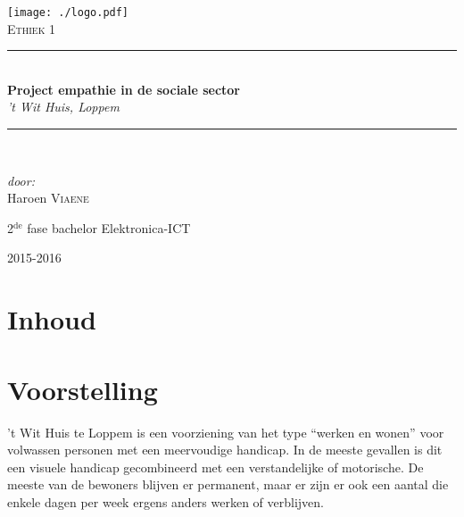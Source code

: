 \documentclass[a4paper,12pt]{article}
\newcommand{\HRule}{\rule{\linewidth}{0.5mm}}
\begin{document}
\begin{titlepage}
\begin{center}
\texttt{[image: ./logo.pdf]}~\\[1cm]


\textsc{\Large Ethiek 1}\\[0.5cm]

\HRule \\[0.4cm]
{ \LARGE \bfseries Project empathie in de sociale sector}\\[0.4cm]
{\large \textit{'t Wit Huis, Loppem}}\\[0.2cm]

\HRule \\[1.5cm]

\begin{minipage}{0.4\textwidth}
\begin{flushleft} \large
\emph{door:}\\
Haroen \textsc{Viaene}\\

\end{flushleft}
\end{minipage}
\begin{minipage}{0.4\textwidth}
\begin{flushright} \large
\large{2$^{\text{de}}$ fase bachelor Elektronica-ICT}\\
\end{flushright}
\end{minipage}

\vfill

{\large 2015-2016}

\end{center}
\end{titlepage}

\newpage

\section*{Inhoud}

\tableofcontents

\newpage

\section{Voorstelling}


’t Wit Huis te Loppem is een voorziening van het type ``werken en wonen'' voor volwassen personen met een meervoudige handicap. In de meeste gevallen is dit een visuele handicap gecombineerd met een verstandelijke of motorische. De meeste van de bewoners blijven er permanent, maar er zijn er ook een aantal die enkele dagen per week ergens anders werken of verblijven.
\end{document}

